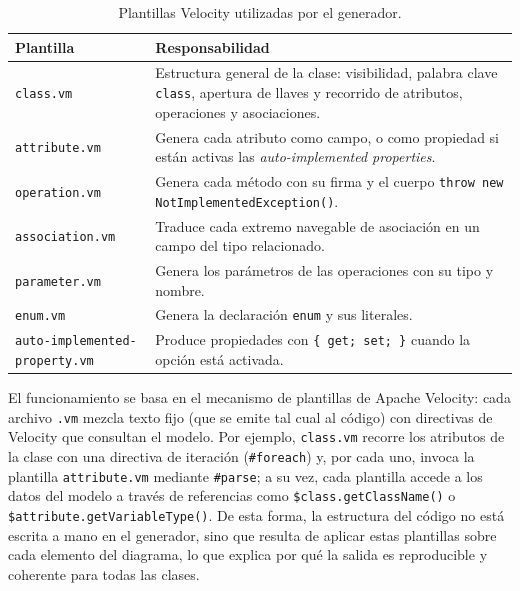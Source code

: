 \documentclass[journal,onecolumn]{IEEEtran}
\begin{document}
	\begin{table}[H]
		\caption{Plantillas Velocity utilizadas por el generador.}
		\label{tab:plantillas}
		\centering
		\begin{tabularx}{\linewidth}{|L{4.2cm}|X|}
			\hline
			\textbf{Plantilla} & \textbf{Responsabilidad} \\
			\hline
			\texttt{class.vm} & Estructura general de la clase: visibilidad, palabra clave \texttt{class}, apertura de llaves y recorrido de atributos, operaciones y asociaciones. \\
			\hline
			\texttt{attribute.vm} & Genera cada atributo como campo, o como propiedad si están activas las \emph{auto-implemented properties}. \\
			\hline
			\texttt{operation.vm} & Genera cada método con su firma y el cuerpo \texttt{throw new NotImplementedException()}. \\
			\hline
			\texttt{association.vm} & Traduce cada extremo navegable de asociación en un campo del tipo relacionado. \\
			\hline
			\texttt{parameter.vm} & Genera los parámetros de las operaciones con su tipo y nombre. \\
			\hline
			\texttt{enum.vm} & Genera la declaración \texttt{enum} y sus literales. \\
			\hline
			\texttt{auto-implemented-property.vm} & Produce propiedades con \texttt{\{ get; set; \}} cuando la opción está activada. \\
			\hline
		\end{tabularx}
	\end{table}
	
	El funcionamiento se basa en el mecanismo de plantillas de Apache Velocity: cada archivo \texttt{.vm} mezcla texto fijo (que se emite tal cual al código) con directivas de Velocity que consultan el modelo. Por ejemplo, \texttt{class.vm} recorre los atributos de la clase con una directiva de iteración (\texttt{\#foreach}) y, por cada uno, invoca la plantilla \texttt{attribute.vm} mediante \texttt{\#parse}; a su vez, cada plantilla accede a los datos del modelo a través de referencias como \texttt{\$class.getClassName()} o \texttt{\$attribute.getVariableType()}. De esta forma, la estructura del código no está escrita a mano en el generador, sino que resulta de aplicar estas plantillas sobre cada elemento del diagrama, lo que explica por qué la salida es reproducible y coherente para todas las clases.
	
\end{document}
